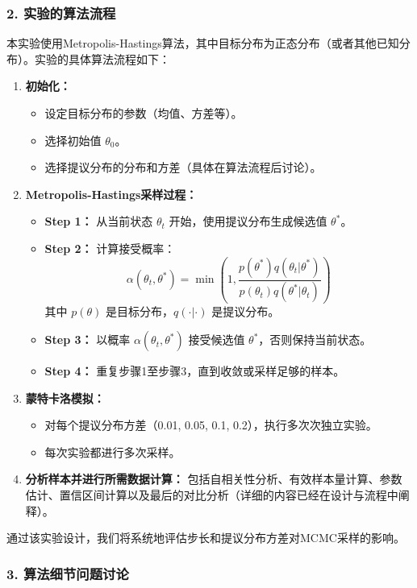 \documentclass[12pt]{article}
\begin{document}
\subsubsection*{2. 实验的算法流程}

本实验使用Metropolis-Hastings算法，其中目标分布为正态分布（或者其他已知分布）。实验的具体算法流程如下：

\begin{enumerate}
	\item \textbf{初始化：}
	\begin{itemize}
		\item 设定目标分布的参数（均值、方差等）。
		\item 选择初始值 \( \theta_0 \)。
		\item 选择提议分布的分布和方差（具体在算法流程后讨论）。
	\end{itemize}
	\item \textbf{Metropolis-Hastings采样过程：}
	\begin{itemize}
		\item \textbf{Step 1：} 从当前状态 \( \theta_t \) 开始，使用提议分布生成候选值 \( \theta^* \)。
		\item \textbf{Step 2：} 计算接受概率：
		\[
		\alpha(\theta_t, \theta^*) = \min\left(1, \frac{p(\theta^*) q(\theta_t | \theta^*)}{p(\theta_t) q(\theta^* | \theta_t)}\right)
		\]
		其中 \( p(\theta) \) 是目标分布，\( q(\cdot|\cdot) \) 是提议分布。
		\item \textbf{Step 3：} 以概率 \( \alpha(\theta_t, \theta^*) \) 接受候选值 \( \theta^* \)，否则保持当前状态。
		\item \textbf{Step 4：} 重复步骤1至步骤3，直到收敛或采样足够的样本。
	\end{itemize}
	\item \textbf{蒙特卡洛模拟：}
	\begin{itemize}
		\item 对每个提议分布方差（0.01, 0.05, 0.1, 0.2），执行多次次独立实验。
		\item 每次实验都进行多次采样。
	\end{itemize}
	\item \textbf{分析样本并进行所需数据计算：} 包括自相关性分析、有效样本量计算、参数估计、置信区间计算以及最后的对比分析（详细的内容已经在设计与流程中阐释）。
\end{enumerate}

通过该实验设计，我们将系统地评估步长和提议分布方差对MCMC采样的影响。

\subsubsection*{3. 算法细节问题讨论}
\end{document}
